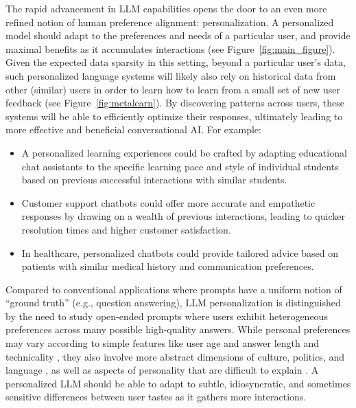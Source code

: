 The rapid advancement in LLM capabilities opens the door to an even more refined notion of human preference alignment: personalization.
A personalized model should adapt to the preferences and needs of a particular user, and provide maximal benefits as it accumulates interactions (see Figure~\ref{fig:main_figure}).
Given the expected data sparsity in this setting, beyond a particular user's data, such personalized language systems will likely also rely on historical data from other (similar) users in order to learn how to learn from a small set of new user feedback (see Figure~\ref{fig:metalearn}).
By discovering patterns across users, these systems will be able to efficiently optimize their responses, ultimately leading to more effective and beneficial conversational AI.  For example:
\begin{itemize}
\item A personalized learning experiences could be crafted by adapting educational chat assistants to the specific learning pace and style of individual students based on previous successful interactions with similar students.  
\item 
Customer support chatbots could offer more accurate and empathetic responses by drawing on a wealth of previous interactions, leading to quicker resolution times and higher customer satisfaction. 
\item In healthcare, personalized chatbots could provide tailored advice based on patients with similar medical history and communication preferences. 
\end{itemize}

Compared to conventional applications where prompts have a uniform notion of ``ground truth'' (e.g., question answering),
LLM personalization is distinguished by the need to study open-ended prompts where users exhibit heterogeneous preferences across many possible high-quality answers.
While personal preferences may vary according to simple features like user age \cite{chan2024scalingsyntheticdatacreation, castricato2024personareproducibletestbedpluralistic} and answer length and technicality \cite{li2024personalizedlanguagemodelingpersonalized}, they also involve more abstract dimensions of culture, politics, and language \cite{kirk2024prismalignmentprojectparticipatory}, as well as aspects of personality that are difficult to explain \citep{hwang2023aligninglanguagemodelsuser}.
A personalized LLM should be able to adapt to 
subtle, idiosyncratic, and sometimes sensitive differences between user tastes as it gathers more interactions.

